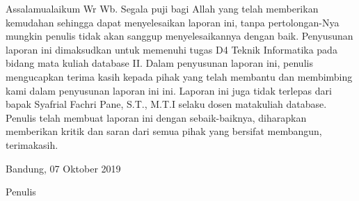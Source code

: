\begin{acknowledgements}
Assalamualaikum Wr Wb. Segala puji bagi Allah yang telah memberikan kemudahan sehingga dapat menyelesaikan laporan ini, tanpa pertolongan-Nya mungkin penulis tidak akan sanggup menyelesaikannya dengan baik. Penyusunan laporan ini dimaksudkan untuk memenuhi tugas D4 Teknik Informatika pada bidang mata kuliah database II. Dalam penyusunan laporan ini, penulis mengucapkan terima kasih kepada pihak yang telah membantu dan membimbing kami dalam penyusunan laporan ini ini. Laporan ini juga tidak terlepas dari bapak Syafrial Fachri Pane, S.T., M.T.I selaku dosen matakuliah database. Penulis telah membuat laporan ini dengan sebaik-baiknya, diharapkan memberikan kritik dan saran dari semua pihak yang bersifat membangun, terimakasih.

\begin{raggedleft}

Bandung, 07 Oktober 2019

Penulis

\end{raggedleft}

\end{acknowledgements}